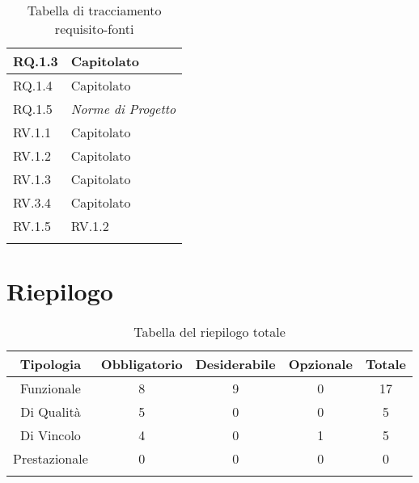 \begin{center}
\begin{longtable}{|C{6cm}|C{6cm}|}
    RQ.1.3 & Capitolato \\ \hline
    RQ.1.4 & Capitolato \\ \hline
    RQ.1.5 & \textit{Norme di Progetto} \\ \hline
    RV.1.1 & Capitolato \\ \hline
    RV.1.2 & Capitolato \\ \hline
    RV.1.3 & Capitolato \\ \hline
    RV.3.4 & Capitolato \\ \hline
    RV.1.5 & RV.1.2 \\ \hline

    \caption{Tabella di tracciamento requisito-fonti}
  \end{longtable}
\end{center}


\section{Riepilogo}

\begin{center}
  \centering
  \begin{longtable}{|c|c|c|c|c|}
    \hline
    \rowcolor[HTML]{036400}
    {\color[HTML]{FFFFFF} \textbf{Tipologia}} & {\color[HTML]{FFFFFF} \textbf{Obbligatorio}} & {\color[HTML]{FFFFFF} \textbf{Desiderabile}} & {\color[HTML]{FFFFFF} \textbf{Opzionale}}  & {\color[HTML]{FFFFFF} \textbf{Totale}} \\ \hline
    \rowcolor[HTML]{EFEFEF}
    Funzionale & 8 & 9 & 0 & 17 \\ \hline
    \rowcolor[HTML]{C0C0C0}
    Di Qualità & 5 & 0 & 0 & 5 \\ \hline
    \rowcolor[HTML]{EFEFEF}
    Di Vincolo & 4 & 0 & 1 & 5 \\ \hline
    \rowcolor[HTML]{C0C0C0}
    Prestazionale & 0 & 0 & 0 & 0 \\ \hline

    \caption{Tabella del riepilogo totale}
  \end{longtable}
\end{center}
